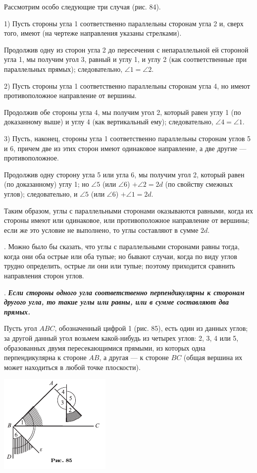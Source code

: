 \documentclass[oneside]{book}
\begin{document}
Рассмотрим особо следующие три случая (рис. 84).

1) Пусть стороны угла 1 соответственно параллельны сторонам угла 2 и, сверх того, имеют  (на чертеже направления указаны стрелками).

Продолжив одну из сторон угла 2 до пересечения с непараллельной ей стороной угла 1, мы получим угол 3, равный и углу 1, и углу 2 (как соответственные при параллельных прямых);
следовательно, $\angle 1 = \angle 2$.

2) Пусть стороны угла 1 соответственно параллельны сторонам угла 4, но имеют противоположное направление от вершины.

Продолжив обе стороны угла 4, мы получим угол 2, который равен углу 1 (по доказанному выше) и углу 4 (как вертикальный ему);
следовательно, $\angle 4 = \angle 1$.

3) Пусть, наконец, стороны угла 1 соответственно параллельны сторонам углов 5 и 6, причем две из этих сторон имеют одинаковое направление, а две другие — противоположное.

Продолжив одну сторону угла 5 или угла 6, мы получим угол 2, который равен (по доказанному) углу 1;
но $\angle 5$ (или $\angle 6$) $+\angle 2 = 2d$ (по свойству смежных углов);
следовательно, и $\angle 5$ (или $\angle 6$) $+ \angle 1 = 2d$.

Таким образом, углы с параллельными сторонами оказываются равными, когда их стороны имеют или одинаковое, или противоположное направление от вершины;
если же это условие не выполнено, то углы составляют в сумме $2d$.

.
Можно было бы сказать, что углы с параллельными сторонами равны тогда, когда они оба острые или оба тупые;
но бывают случаи, когда по виду углов трудно определить, острые ли они или тупые;
поэтому приходится сравнить направления сторон углов.

.
\textbf{\emph{Если стороны одного угла соответственно перпендикулярны к сторонам другого угла, то такие углы или равны, или в сумме составляют два прямых.}}

Пусть угол $ABC$, обозначенный цифрой 1 (рис. 85), есть один из данных углов;
за другой данный угол возьмем какой-нибудь из четырех углов:
2, 3, 4 или 5, образованных двумя пересекающимися прямыми, из которых одна перпендикулярна к стороне $AB$, а другая — к стороне $BC$ (общая вершина их может находиться в любой точке плоскости).

\includegraphics{pics/ris-85}
\end{document}
